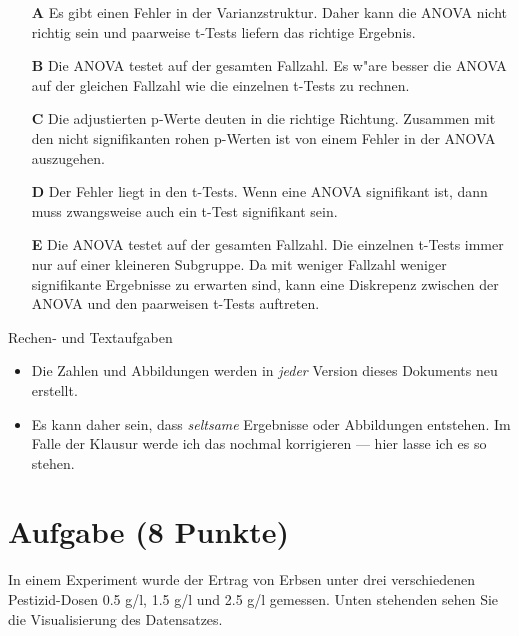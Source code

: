 \documentclass[a4paper, 10pt]{scrartcl}\usepackage[]{graphicx}\usepackage[]{xcolor}
\begin{document}
\begin{enumerate}
\item [\textbf{A} \msquare] Es gibt einen Fehler in der Varianzstruktur. Daher kann die ANOVA nicht richtig sein und paarweise t-Tests liefern das richtige Ergebnis.
\item [\textbf{B} \msquare] Die ANOVA testet auf der gesamten Fallzahl. Es w{"a}re besser die ANOVA auf der gleichen Fallzahl wie die einzelnen t-Tests zu rechnen.
\item [\textbf{C} \msquare] Die adjustierten p-Werte deuten in die richtige Richtung. Zusammen mit den nicht signifikanten rohen p-Werten ist von einem Fehler in der ANOVA auszugehen.
\item [\textbf{D} \msquare] Der Fehler liegt in den t-Tests. Wenn eine ANOVA signifikant ist, dann muss zwangsweise auch ein t-Test signifikant sein.
\item [\textbf{E} \msquare] Die ANOVA testet auf der gesamten Fallzahl. Die einzelnen t-Tests immer nur auf einer kleineren Subgruppe. Da mit weniger Fallzahl weniger signifikante Ergebnisse zu erwarten sind, kann eine Diskrepenz zwischen der ANOVA und den paarweisen t-Tests auftreten.
\end{enumerate}

\clearpage
\begin{graybox}{Rechen- und Textaufgaben}
  \begin{itemize}
  \item Die Zahlen und Abbildungen werden in \textit{jeder} Version dieses
    Dokuments neu erstellt.
  \item Es kann daher sein, dass \textit{seltsame} Ergebnisse oder
    Abbildungen entstehen. Im Falle der Klausur werde ich das nochmal
    korrigieren --- hier lasse ich es so stehen.  
  \end{itemize}
\end{graybox}
\clearpage

\section{Aufgabe \hfill (8 Punkte)}

In einem Experiment wurde der Ertrag von Erbsen unter drei verschiedenen
Pestizid-Dosen 0.5 g/l, 1.5 g/l und 2.5 g/l gemessen. Unten stehenden sehen
Sie die Visualisierung des Datensatzes.
\end{document}
